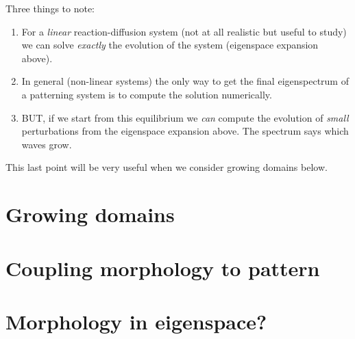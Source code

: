 \documentclass{report}
\begin{document}
Three things to note:
\begin{enumerate}
\item For a \textit{linear} reaction-diffusion system (not at all realistic
but useful to study) we can solve \textit{exactly} the evolution of the system
(eigenspace expansion above).
\item In general (non-linear systems) the only way to get the final eigenspectrum 
of a patterning system is to compute the solution numerically.
\item BUT, if we start from this equilibrium we \textit{can} compute the
evolution of \textit{small} perturbations from the eigenspace expansion above.
The spectrum says which waves grow.
\end{enumerate}

This last point will be very useful when we consider growing domains below.

\section{Growing domains}

\section{Coupling morphology to pattern}

\section{Morphology in eigenspace?}

\section{}
\end{document}
